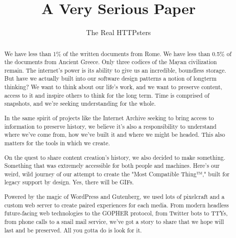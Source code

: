 \documentclass[letterpaper]{article}
\begin{document}
\title{A Very Serious Paper}

\author{The Real HTTPsters}

\maketitle

\begin{abstract}
We have less than 1\% of the written documents from Rome. We have less
than 0.5\% of the documents from Ancient Greece. Only three codices of
the Mayan civilization remain. The internet’s power is its ability to
give us an incredible, boundless storage. But have we actually built
into our software design patterns a notion of longterm thinking? We
want to think about our life’s work, and we want to preserve content,
access to it and inspire others to think for the long term. Time is
comprised of snapshots, and we’re seeking understanding for the whole.

In the same spirit of projects like the Internet Archive seeking to
bring access to information to preserve history, we believe it’s also
a responsibility to understand where we’ve come from, how we’ve built
it and where we might be headed. This also matters for the tools in
which we create.

On the quest to share content creation’s history, we also decided to
make something. Something that was extremely accessible for both
people and machines. Here's our weird, wild journey of our attempt to
create the "Most Compatible Thing™," built for legacy support by
design. Yes, there will be GIFs.

Powered by the magic of WordPress and Gutenberg, we used lots of
pixelcraft and a custom web server to create paired experiences for
each media. From modern headless future-facing web technologies to the
GOPHER protocol, from Twitter bots to TTYs, from phone calls to a
snail mail service, we've got a story to share that we hope will last
and be preserved. All you gotta do is look for it.
\end{abstract}
\end{document}
